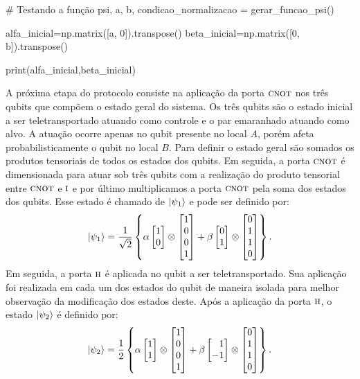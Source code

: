 \begin{pycode}
# Testando a função
psi, a, b, condicao_normalizacao = gerar_funcao_psi()

alfa_inicial=np.matrix([a, 0]).transpose()
beta_inicial=np.matrix([0, b]).transpose()

print(alfa_inicial,beta_inicial)
\end{pycode}
A próxima etapa do protocolo consiste na aplicação da porta \(\operatorname{\textsc{cnot}}\) nos três qubits que compõem o estado geral do sistema. Os três qubits são o estado inicial a ser teletransportado atuando como controle e o par emaranhado atuando como alvo. A atuação ocorre apenas no qubit presente no local \(A\), porém afeta probabilisticamente o qubit no local \(B\). Para definir o estado geral são somados os produtos tensoriais de todos os estados dos qubits. Em seguida, a porta \(\operatorname{\textsc{cnot}}\) é dimensionada para atuar sob três qubits com a realização do produto tensorial entre \(\operatorname{\textsc{cnot}}\) e \(\operatorname{\textsc{i}}\) e por último multiplicamos a porta \(\operatorname{\textsc{cnot}}\) pela soma dos estados dos qubits. Esse estado é chamado de \(\ket{\psi_1}\) e pode ser definido por:
\[
  \ket{\psi_1} = \frac{1}{\sqrt2} \left\{
    \alpha
    \begin{bmatrix} 1 \\ 0 \end{bmatrix} \otimes
    \begin{bmatrix} 1 \\ 0 \\ 0 \\ 1 \end{bmatrix} +
    \beta
    \begin{bmatrix} 0 \\ 1 \end{bmatrix} \otimes
    \begin{bmatrix} 0 \\ 1 \\ 1 \\ 0 \end{bmatrix}
  \right\}.
\]
Em seguida, a porta \(\operatorname{\textsc{h}}\) é aplicada no qubit a ser teletransportado. Sua aplicação foi realizada em cada um dos estados do qubit de maneira isolada para melhor observação da modificação dos estados deste. Após a aplicação da porta \(\operatorname{\textsc{h}}\), o estado \(\ket{\psi_2}\) é definido por:
\[
  \ket{\psi_2} = \frac{1}{2} \left\{
    \alpha
    \begin{bmatrix} 1 \\ 1 \end{bmatrix} \otimes
    \begin{bmatrix} 1 \\ 0 \\ 0 \\ 1 \end{bmatrix} +
    \beta
    \begin{bmatrix*}[r] 1 \\ -1 \end{bmatrix*} \otimes
    \begin{bmatrix} 0 \\ 1 \\ 1 \\ 0 \end{bmatrix}
  \right\}.
\]

